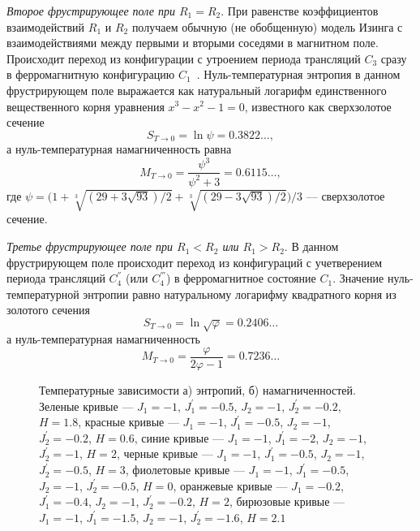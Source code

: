 \emph{Второе фрустрирующее поле при $R_1 = R_2$}. При равенстве коэффициентов взаимодействий $R_1$ и $R_2$ получаем обычную (не обобщенную) модель Изинга с взаимодействиями между первыми и вторыми соседями в магнитном поле. Происходит переход из конфигурации с утроением периода трансляций $C_3$ сразу в ферромагнитную конфигурацию $C_1$~\cite{zarubin2019}. Нуль-температурная энтропия в данном фрустрирующем поле выражается как натуральный логарифм единственного вещественного корня уравнения \mbox{$x^3-x^2-1=0$}, известного как сверхзолотое сечение
\begin{equation}
S_{T\rightarrow 0} = \ln \psi = 0.3822\dots,
\label{22}
\end{equation}
а нуль-температурная намагниченность равна
\begin{equation}
M_{T\rightarrow 0} = \frac{\psi^3}{\psi^2+3} = 0.6115\dots,
\label{23}
\end{equation}
где $\psi = \Big(1+\sqrt[3]{(29+3\sqrt{93})/2}+\sqrt[3]{(29-3\sqrt{93})/2}\Big)/3$ --- сверхзолотое сечение.

\emph{Третье фрустрирующее поле при $R_1 < R_2$ или $R_1 > R_2$}. В данном фрустрирующем поле происходит переход из конфигураций с учетверением  периода трансляций $C_{4}^{''}$ (или $C_4^{'''}$) в ферромагнитное состояние $C_1$. Значение нуль-температурной энтропии равно натуральному логарифму квадратного корня из золотого сечения
\begin{equation}
S_{T\rightarrow 0} = \ln \sqrt{\varphi} = 0.2406\dots
\label{24}
\end{equation}
а нуль-температурная намагниченность
\begin{equation}
M_{T\rightarrow 0} = \frac{\varphi}{2\varphi -1} = 0.7236\dots
\label{25}
\end{equation}

 \begin{figure}[h]
 	\begin{minipage}{0.47\linewidth}
 	\end{minipage}
 	\hfill
 	\begin{minipage}{0.47\linewidth}
 	\end{minipage}
 	\caption{Температурные зависимости а) энтропий, б) намагниченностей. Зеленые кривые --- $J_1 = -1$, $J_1^{'} = -0.5$, $J_2 = -1$, $J_2^{'} = -0.2$, $H = 1.8$, красные кривые --- $J_1 = -1$, $J_1^{'} = -0.5$, $J_2 = -1$, $J_2^{'} = -0.2$, $H = 0.6$, синие кривые --- $J_1 = -1$, $J_1^{'} = -2$, $J_2 = -1$, $J_2^{'} = -1$, $H = 2$, черные кривые --- $J_1 = -1$, $J_1^{'} = -0.5$, $J_2 = -1$, $J_2^{'} = -0.5$, $H = 3$, фиолетовые кривые --- $J_1 = -1$, $J_1^{'} = -0.5$, $J_2 = -1$, $J_2^{'} = -0.5$, $H = 0$, оранжевые кривые --- $J_1 = -0.2$, $J_1^{'} = -0.4$, $J_2 = -1$, $J_2^{'} = -0.2$, $H = 2$, бирюзовые кривые --- $J_1 = -1$, $J_1^{'} = -1.5$, $J_2 = -1$, $J_2^{'} = -1.6$, $H = 2.1$}
 	\label{EntAndMagGenChain1}
 \end{figure}


